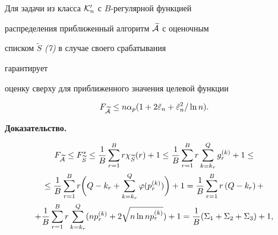\begin{lem}


\label{lm5p}


Для задачи из класса ${\cal K}_n'$ с $B$-регулярной функцией


распределения приближенный алгоритм $\widetilde{ \cal A}$ с оценочным


списком $\widetilde {S}$ {\em (7)} в случае своего срабатывания


гарантирует


оценку сверху для приближенного значения целевой функции


$$


F_{\widetilde {\cal A}} \le


n\alpha_{p} (1+2\Tilde {\varepsilon }_{n}+


{\Tilde {\varepsilon }_{n}}^{2}/\ln n).


$$


\end{lem}





{\bf Доказательство.}


\begin{gather*}


F_{\widetilde {\cal A}} \le F_{\widetilde S}^{\ast}


\le \frac {1}{B} \sum_{r=1}^{B}r\chi_{\widetilde S}(r) + 1


\le \frac {1}{B} \sum_{r=1}^{B}r \sum_{k=k_{r}}^{Q}g_{r}^{(k)}+1


\le \\


%


\le


\frac {1}{B} \sum_{r=1}^{B}r


\biggl(


Q-k_{r}+\sum_{k=k_{r}}^{Q} \varphi (p_{r}^{(k)})


\biggr) + 1 =


\frac {1}{B} \sum _{r=1}^{B}r \left ( Q-k_{r} \right ) +\\


%


+


\frac {1}{B} \sum_{r=1}^{B}r \sum _{k=k_{r}}^{Q}


(np_{r}^{(k)} + 2 \sqrt {n \ln n p_{r}^{(k)}}) + 1 =


\frac {1}{B} (\Sigma _{1} + \Sigma _{2} + \Sigma_{3}) + 1,


\end{gather*}


